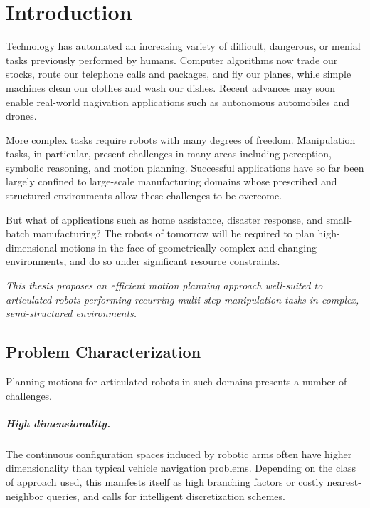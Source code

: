 \chapter{Introduction}


Technology has automated an increasing variety of
difficult, dangerous, or menial tasks
previously performed by humans.
Computer algorithms now trade our stocks,
route our telephone calls and packages,
and fly our planes,
while simple machines clean our clothes and wash our dishes.
Recent advances may soon enable real-world nagivation applications
such as autonomous automobiles and drones.

More complex tasks require robots with many degrees of freedom.
Manipulation tasks, in particular,
present challenges in many areas including
perception, symbolic reasoning, and motion planning.
Successful applications have so far been largely
confined to large-scale manufacturing domains
whose prescribed and structured environments
allow these challenges to be overcome.

But what of applications such as
home assistance, disaster response, and small-batch manufacturing?
The robots of tomorrow will be required to plan
high-dimensional motions
in the face of geometrically complex and changing environments,
and do so under significant resource constraints.


\begin{adjustwidth}{0.3in}{0.3in}
\emph{%
This thesis proposes an
efficient motion planning approach
well-suited
to articulated robots
performing recurring multi-step manipulation tasks
in complex, semi-structured environments.
}
\end{adjustwidth}

\section{Problem Characterization}

Planning motions for articulated robots in such domains
presents a number of challenges.

\paragraph{High dimensionality.}
The continuous configuration spaces induced by robotic arms
often have higher dimensionality than typical vehicle navigation
problems.
Depending on the class of approach used,
this manifests itself as high branching factors
or costly nearest-neighbor queries,
and calls for intelligent discretization schemes.

